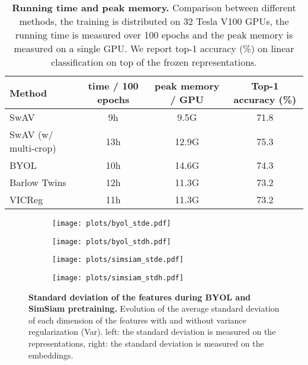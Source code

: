 \documentclass{article}
\newcommand{\algo}{VICReg}
\begin{document}
\vspace{6mm}

\begin{table}[h]
\caption{\textbf{Running time and peak memory.} Comparison between different methods, the training is distributed on 32 Tesla V100 GPUs, the running time is measured over 100 epochs and the peak memory is measured on a single GPU. We report top-1 accuracy (\%) on linear classification on top of the frozen representations.}
\vspace{-6mm}
\label{tab:running_time}
\vskip 0.15in
\begin{center}
\begin{tabular}{lccc}
\toprule
Method & time / 100 epochs & peak memory / GPU & Top-1 accuracy (\%) \\
\midrule
SwAV                        &   9h      &   9.5G    & 71.8 \\
SwAV (w/ multi-crop)        &   13h     &   12.9G   & 75.3 \\
BYOL                        &   10h     &   14.6G   & 74.3 \\
Barlow Twins                &   12h     &   11.3G   & 73.2 \\
\algo                       &   11h     &   11.3G   & 73.2 \\
\bottomrule
\end{tabular}
\end{center}
\end{table}

\newpage
\setcounter{figure}{2}

\begin{figure}[b]
\centering
\hspace{-4em}
\begin{subfigure}{.4\textwidth}
    \centering
    \texttt{[image: plots/byol\_stde.pdf]}
\end{subfigure}\hspace{5em}
\begin{subfigure}{.4\textwidth}
    \centering
    \texttt{[image: plots/byol\_stdh.pdf]}
\end{subfigure}
\end{figure}
\begin{figure}[b]
\vspace{-3em}
\centering
\hspace{-4em}
\begin{subfigure}{.4\textwidth}
    \centering
    \texttt{[image: plots/simsiam\_stde.pdf]}
\end{subfigure}\hspace{5em}
\begin{subfigure}{.4\textwidth}
    \centering
    \texttt{[image: plots/simsiam\_stdh.pdf]}
\end{subfigure}
\caption{\textbf{Standard deviation of the features during BYOL and SimSiam pretraining.} Evolution of the average standard deviation of each dimension of the features with and without variance regularization (Var). left: the standard deviation is measured on the representations, right: the standard deviation is measured on the embeddings.}
\label{fig:std}
\end{figure}
\end{document}
